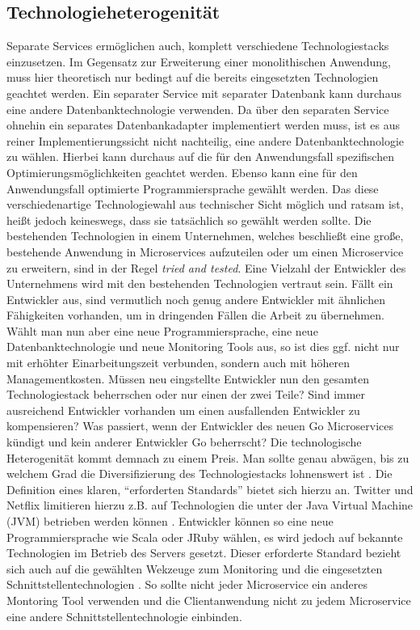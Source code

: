 \subsection{Technologieheterogenität}
Separate Services ermöglichen auch, komplett verschiedene Technologiestacks einzusetzen. Im Gegensatz zur Erweiterung einer monolithischen Anwendung, muss hier theoretisch nur bedingt auf die bereits eingesetzten Technologien geachtet werden. Ein separater Service mit separater Datenbank kann durchaus eine andere Datenbanktechnologie verwenden. Da über den separaten Service ohnehin ein separates Datenbankadapter implementiert werden muss, ist es aus reiner Implementierungssicht nicht nachteilig, eine andere Datenbanktechnologie zu wählen. Hierbei kann durchaus auf die für den Anwendungsfall spezifischen Optimierungsmöglichkeiten geachtet werden. Ebenso kann eine für den Anwendungsfall optimierte Programmiersprache gewählt werden.
Das diese verschiedenartige Technologiewahl aus technischer Sicht möglich und ratsam ist, heißt jedoch keineswegs, dass sie tatsächlich so gewählt werden sollte. Die bestehenden Technologien in einem Unternehmen, welches beschließt eine große, bestehende Anwendung in Microservices aufzuteilen oder um einen Microservice zu erweitern, sind in der Regel \textit{tried and tested}. Eine Vielzahl der Entwickler des Unternehmens wird mit den bestehenden Technologien vertraut sein. Fällt ein Entwickler aus, sind vermutlich noch genug andere Entwickler mit ähnlichen Fähigkeiten vorhanden, um in dringenden Fällen die Arbeit zu übernehmen. Wählt man nun aber eine neue Programmiersprache, eine neue Datenbanktechnologie und neue Monitoring Tools aus, so ist dies ggf. nicht nur mit erhöhter Einarbeitungszeit verbunden, sondern auch mit höheren Managementkosten. Müssen neu eingstellte Entwickler nun den gesamten Technologiestack beherrschen oder nur einen der zwei Teile? Sind immer ausreichend Entwickler vorhanden um einen ausfallenden Entwickler zu kompensieren? Was passiert, wenn der Entwickler des neuen Go Microservices kündigt und kein anderer Entwickler Go beherrscht? Die technologische Heterogenität kommt demnach zu einem Preis. Man sollte genau abwägen, bis zu welchem Grad die Diversifizierung des Technologiestacks lohnenswert ist \cite[vgl.][Seiten 5, 6]{newman2015building}.
Die Definition eines klaren, \enquote{erforderten Standards} \cite[vgl.][Seiten 20, 21]{newman2015building} bietet sich hierzu an. Twitter und Netflix limitieren hierzu z.B. auf Technologien die unter der Java Virtual Machine (JVM) betrieben werden können \cite[][Seite 6]{newman2015building}. Entwickler können so eine neue Programmiersprache wie Scala oder JRuby wählen, es wird jedoch auf bekannte Technologien im Betrieb des Servers gesetzt. Dieser erforderte Standard bezieht sich auch auf die gewählten Wekzeuge zum Monitoring und die eingesetzten Schnittstellentechnologien \cite[vgl.][Seite 21]{newman2015building}. So sollte nicht jeder Microservice ein anderes Montoring Tool verwenden und die Clientanwendung nicht zu jedem Microservice eine andere Schnittstellentechnologie einbinden.

